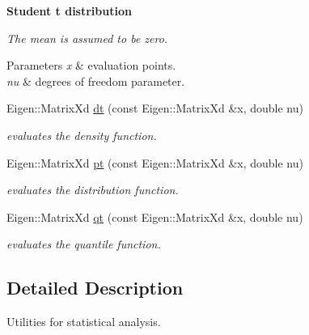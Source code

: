 \begin{Indent}{\bf Student t distribution}\par
{\em The mean is assumed to be zero. 
\begin{DoxyParams}{Parameters}
{\em x} & evaluation points. \\
\hline
{\em nu} & degrees of freedom parameter. \\
\hline
\end{DoxyParams}
}\begin{DoxyCompactItemize}
\item 
Eigen\+::\+Matrix\+Xd \hyperlink{namespacetools__stats_a5e7510b1466769b55d822c9e219e7411}{dt} (const Eigen\+::\+Matrix\+Xd \&x, double nu)\hypertarget{namespacetools__stats_a5e7510b1466769b55d822c9e219e7411}{}\label{namespacetools__stats_a5e7510b1466769b55d822c9e219e7411}

\begin{DoxyCompactList}\small\item\em evaluates the density function. \end{DoxyCompactList}\item 
Eigen\+::\+Matrix\+Xd \hyperlink{namespacetools__stats_a771894e518016ab0e5264252983b109f}{pt} (const Eigen\+::\+Matrix\+Xd \&x, double nu)\hypertarget{namespacetools__stats_a771894e518016ab0e5264252983b109f}{}\label{namespacetools__stats_a771894e518016ab0e5264252983b109f}

\begin{DoxyCompactList}\small\item\em evaluates the distribution function. \end{DoxyCompactList}\item 
Eigen\+::\+Matrix\+Xd \hyperlink{namespacetools__stats_a285a8ae16aea054b21c9d29966776db5}{qt} (const Eigen\+::\+Matrix\+Xd \&x, double nu)\hypertarget{namespacetools__stats_a285a8ae16aea054b21c9d29966776db5}{}\label{namespacetools__stats_a285a8ae16aea054b21c9d29966776db5}

\begin{DoxyCompactList}\small\item\em evaluates the quantile function. \end{DoxyCompactList}\end{DoxyCompactItemize}
\end{Indent}


\subsection{Detailed Description}
Utilities for statistical analysis. 

